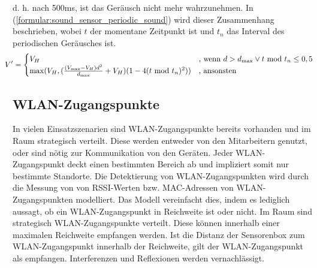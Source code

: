 d. h. nach 500ms, ist das Geräusch nicht mehr wahrzunehmen.
In (\ref{formular:sound_sensor_periodic_sound}) wird dieser Zusammenhang beschrieben,
wobei $t$ der momentane Zeitpunkt ist und $t_{n}$ das Interval des periodischen Geräusches ist.
\begin{align}
    \label{formular:sound_sensor_periodic_sound}
    \hspace{-0.4cm}
    V^{\prime} = \begin{cases}
                     V_H & \text{, wenn } d > d_{\max} \vee t\ \text{mod}\ t_{n}\leq 0,5 \\
                     \max(V_H, (\frac{(V_{\max} - V_H)d^2}{d_{\max}} + V_H)(1 - 4(t\ \text{mod}\ t_{n})^2)) & \text{, ansonsten}
    \end{cases}
\end{align}

\subsection{WLAN-Zugangspunkte}
In vielen Einsatzszenarien sind WLAN-Zugangspunkte bereits vorhanden und im Raum strategisch verteilt.
Diese werden entweder von den Mitarbeitern genutzt, oder sind nötig zur Kommunikation von den Geräten.
Jeder WLAN-Zugangspunkt deckt einen bestimmten Bereich ab und impliziert somit nur bestimmte Standorte.
\newline
\newline
Die Detektierung von WLAN-Zugangspunkten wird durch die Messung von von RSSI-Werten bzw. MAC-Adressen von WLAN-Zugangspunkten modelliert.
Das Modell vereinfacht dies, indem es lediglich aussagt, ob ein WLAN-Zugangspunkt in Reichweite ist oder nicht.
\newline
\newline
Im Raum sind strategisch WLAN-Zugangspunkte verteilt.
Diese können innerhalb einer maximalen Reichweite empfangen werden.
Ist die Distanz der Sensorenbox zum WLAN-Zugangspunkt innerhalb der Reichweite, gilt der WLAN-Zugangspunkt als empfangen.
Interferenzen und Reflexionen werden vernachlässigt.